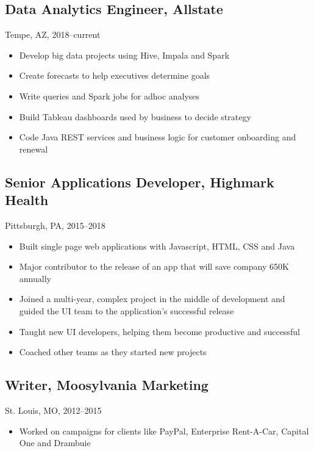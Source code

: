 \documentclass[11pt]{article}
\begin{document}
	\subsection{\normalsize{Data Analytics Engineer, Allstate}}
	{\fontsize{10pt}{\parskip}\selectfont Tempe, AZ, 2018--current}
	\begin{itemize}
	\item Develop big data projects using Hive, Impala and Spark
	\item Create forecasts to help executives determine goals
	\item Write queries and Spark jobs for adhoc analyses
	\item Build Tableau dashboards used by business to decide strategy
	\item Code Java REST services and business logic for customer onboarding and renewal
	\end{itemize}

	 \subsection{\normalsize{Senior Applications Developer, Highmark Health}}
		{\fontsize{10pt}{\parskip}\selectfont Pittsburgh, PA, 2015--2018}
		\begin{itemize}
		\item Built single page web applications with Javascript, HTML, CSS and Java
		\item Major contributor to the release of an app that will save company 650K annually
		\item Joined a multi-year, complex project in the middle of development and guided the UI team to the application's successful release
		\item Taught new UI developers, helping them become productive and successful
		\item Coached other teams as they started new projects
		\end{itemize}

	\subsection{\normalsize{Writer, Moosylvania Marketing}}
	{\fontsize{10pt}{\parskip}\selectfont St. Louis, MO, 2012--2015}
	\begin{itemize}
		\item Worked on campaigns for clients like PayPal, Enterprise Rent-A-Car, Capital One and Drambuie
	\end{itemize}
\end{document}
